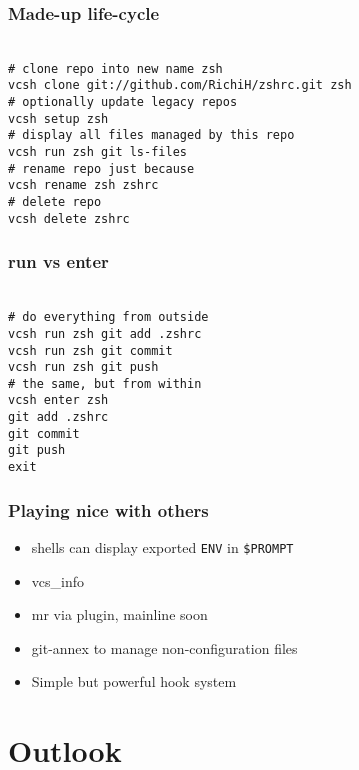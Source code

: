 \documentclass[t]{beamer}
\begin{document}
\begin{frame}
	\frametitle{Made-up life-cycle}
	\texttt{ \\
		\# clone repo into new name zsh \\
		vcsh clone git://github.com/RichiH/zshrc.git zsh \\
		\# optionally update legacy repos \\
		vcsh setup zsh \\
		\# display all files managed by this repo \\
		vcsh run zsh git ls-files \\
		\# rename repo just because \\
		vcsh rename zsh zshrc \\
		\# delete repo \\
		vcsh delete zshrc
	}
\end{frame}

\begin{frame}
	\frametitle{run vs enter}
	\texttt{ \\
		\# do everything from outside \\
		vcsh run zsh git add .zshrc \\
		vcsh run zsh git commit \\
		vcsh run zsh git push \\
		\# the same, but from within\\
		vcsh enter zsh \\
		git add .zshrc \\
		git commit \\
		git push \\
		exit
	}
\end{frame}

\begin{frame}
	\frametitle{Playing nice with others}
	\begin{itemize}
		\item shells can display exported \texttt{ENV} in \texttt{\$PROMPT}
		\item vcs\_info
		\item mr via plugin, mainline soon
		\item git-annex to manage non-configuration files
		\item Simple but powerful hook system
	\end{itemize}
\end{frame}


\section{Outlook}
\end{document}
